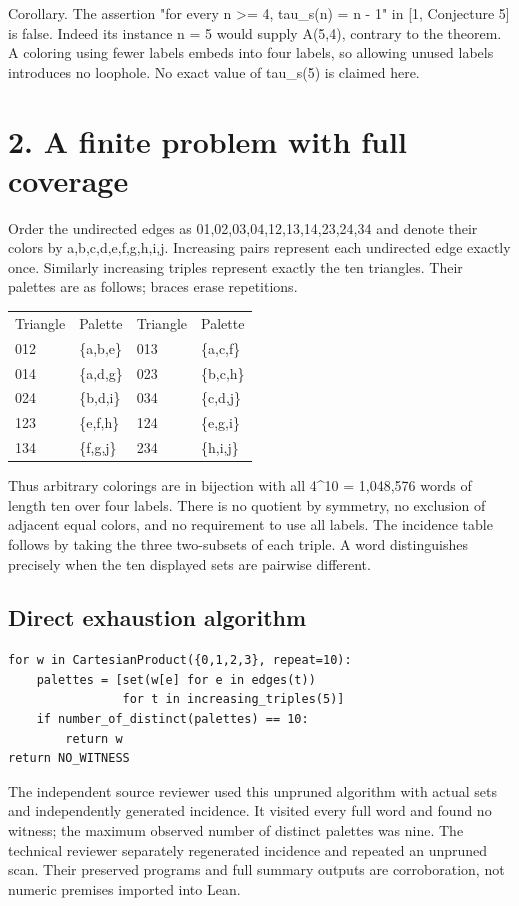 \documentclass[10pt]{article}
\begin{document}
Corollary. The assertion "for every n >= 4, tau\_s(n) = n - 1" in [1, Conjecture 5] is false. Indeed its instance n = 5 would supply A(5,4), contrary to the theorem. A coloring using fewer labels embeds into four labels, so allowing unused labels introduces no loophole. No exact value of tau\_s(5) is claimed here.


\clearpage
\section*{2. A finite problem with full coverage}
Order the undirected edges as 01,02,03,04,12,13,14,23,24,34 and denote their colors by a,b,c,d,e,f,g,h,i,j. Increasing pairs represent each undirected edge exactly once. Similarly increasing triples represent exactly the ten triangles. Their palettes are as follows; braces erase repetitions.


\begin{tabular}{llll}
Triangle & Palette & Triangle & Palette \\
012 & \{a,b,e\} & 013 & \{a,c,f\} \\
014 & \{a,d,g\} & 023 & \{b,c,h\} \\
024 & \{b,d,i\} & 034 & \{c,d,j\} \\
123 & \{e,f,h\} & 124 & \{e,g,i\} \\
134 & \{f,g,j\} & 234 & \{h,i,j\} \\
\end{tabular}\par\medskip
Thus arbitrary colorings are in bijection with all 4^10 = 1,048,576 words of length ten over four labels. There is no quotient by symmetry, no exclusion of adjacent equal colors, and no requirement to use all labels. The incidence table follows by taking the three two-subsets of each triple. A word distinguishes precisely when the ten displayed sets are pairwise different.


\subsection*{Direct exhaustion algorithm}
\begin{verbatim}
for w in CartesianProduct({0,1,2,3}, repeat=10):
    palettes = [set(w[e] for e in edges(t))
                for t in increasing_triples(5)]
    if number_of_distinct(palettes) == 10:
        return w
return NO_WITNESS
\end{verbatim}
The independent source reviewer used this unpruned algorithm with actual sets and independently generated incidence. It visited every full word and found no witness; the maximum observed number of distinct palettes was nine. The technical reviewer separately regenerated incidence and repeated an unpruned scan. Their preserved programs and full summary outputs are corroboration, not numeric premises imported into Lean.
\end{document}
